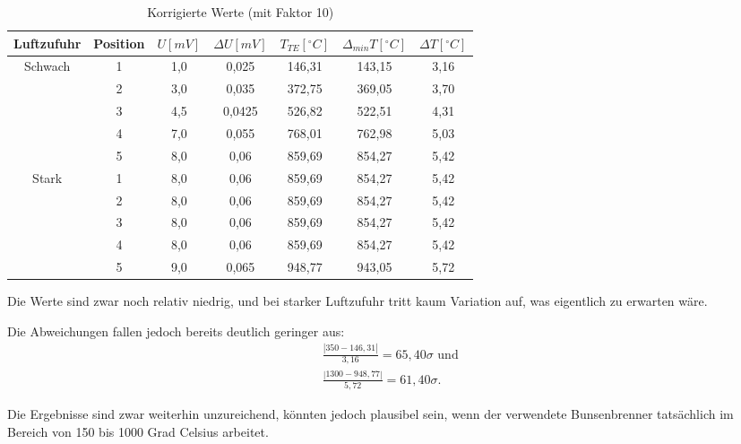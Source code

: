 \begin{table}[h!]
    \onecolumn
    \centering
    \caption{Korrigierte Werte (mit Faktor 10)}
    \label{tab:letzte_tabelle}
    \begin{tabular}{c | c | c | c | c | c | c}
        \toprule
        Luftzufuhr & Position & $U [mV]$ & $\Delta U [mV]$ & $T_{TE} [^\circ C]$ & $\Delta_{min} T [^\circ C]$ & $\Delta T [^\circ C]$ \\
        \midrule
        Schwach & 1 & 1,0 & 0,025 & 146,31 & 143,15 & 3,16 \\
                & 2 & 3,0 & 0,035 & 372,75 & 369,05 & 3,70 \\
                & 3 & 4,5 & 0,0425 & 526,82 & 522,51 & 4,31 \\
                & 4 & 7,0 & 0,055 & 768,01 & 762,98 & 5,03 \\
                & 5 & 8,0 & 0,06 & 859,69 & 854,27 & 5,42 \\
        \hline
        Stark   & 1 & 8,0 & 0,06 & 859,69 & 854,27 & 5,42 \\
                & 2 & 8,0 & 0,06 & 859,69 & 854,27 & 5,42 \\
                & 3 & 8,0 & 0,06 & 859,69 & 854,27 & 5,42 \\
                & 4 & 8,0 & 0,06 & 859,69 & 854,27 & 5,42 \\
                & 5 & 9,0 & 0,065 & 948,77 & 943,05 & 5,72 \\
        \bottomrule
    \end{tabular}
    \twocolumn
\end{table}

Die Werte sind zwar noch relativ niedrig, und bei starker Luftzufuhr tritt kaum Variation auf, was eigentlich zu erwarten wäre. 

Die Abweichungen fallen jedoch bereits deutlich geringer aus:
\begin{align}
    \frac{\left| 350-146,31 \right|}{3,16} = 65,40\sigma \text{ und }\\
    \frac{\left| 1300-948,77 \right|}{5,72} = 61,40\sigma.
\end{align}

Die Ergebnisse sind zwar weiterhin unzureichend, könnten jedoch plausibel sein, wenn der verwendete Bunsenbrenner tatsächlich im Bereich von 
150 bis 1000 Grad Celsius arbeitet.

